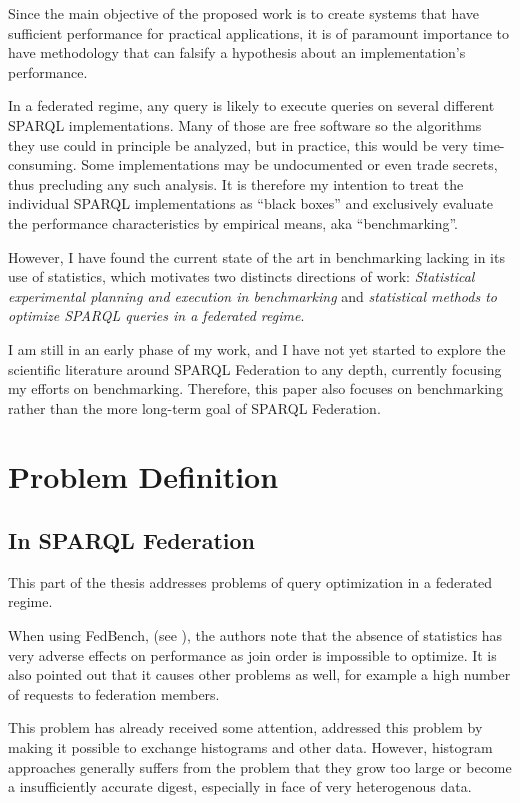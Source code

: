 \documentclass{llncs}
\begin{document}
Since the main objective of the proposed work is to create systems
that have sufficient performance for practical applications, it is of
paramount importance to have methodology that can falsify a
hypothesis about an implementation's performance.

In a federated regime, any query is likely to execute queries on
several different SPARQL implementations. Many of those are free
software so the algorithms they use could in principle be analyzed,
but in practice, this would be very time-consuming. Some
implementations may be undocumented or even trade secrets, thus
precluding any such analysis. It is therefore my intention to treat
the individual SPARQL implementations as ``black boxes'' and
exclusively evaluate the performance characteristics by empirical
means, aka ``benchmarking''.

However, I have found the current state of the art in benchmarking
lacking in its use of statistics, which motivates two distincts
directions of work: \emph{Statistical experimental planning and execution in
benchmarking} and \emph{statistical methods to optimize SPARQL queries
in a federated regime}.

I am still in an early phase of my work, and I have not yet started to
explore the scientific literature around SPARQL Federation to any
depth, currently focusing my efforts on benchmarking. Therefore, this
paper also focuses on benchmarking rather than the more long-term goal
of SPARQL Federation.

\section{Problem Definition}

\subsection{In SPARQL Federation}

This part of the thesis addresses problems of query optimization in a
federated regime.

When using FedBench, (see \cite{Schmidt:2011:FBS:2063016.2063054}),
the authors note that the absence of statistics has very adverse
effects on performance as join order is impossible to optimize. It is
also pointed out that it causes other problems as well, for example a
high number of requests to federation members. 

This problem has already received some attention, \cite{5337556}
addressed this problem by making it possible to exchange histograms
and other data. However, histogram approaches generally suffers from
the problem that they grow too large or become a insufficiently
accurate digest, especially in face of very heterogenous data.
\end{document}
